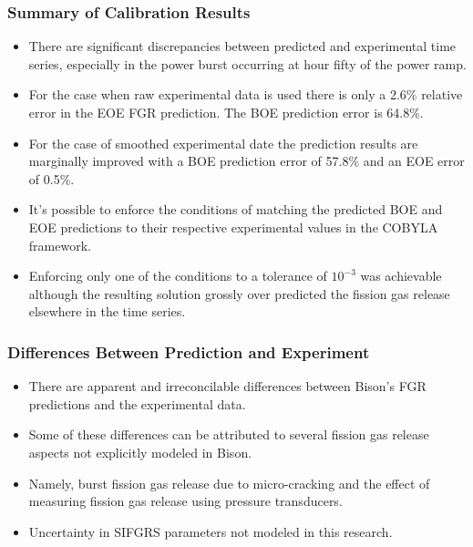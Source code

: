
\begin{frame}
\frametitle{Summary of Calibration Results}

\begin{itemize}
  \item There are significant discrepancies between predicted and experimental time series, especially in the power burst occurring at hour fifty of the power ramp.
  \item For the case when raw experimental data is used there is only a 2.6\% relative error in the EOE FGR prediction. The BOE prediction error is 64.8\%. 
  \item For the case of smoothed experimental date the prediction results are marginally improved with a BOE prediction error of 57.8\% and an EOE error of 0.5\%. 
  \item It's possible to enforce the conditions of matching the predicted BOE and EOE predictions to their respective experimental values in the COBYLA framework. 
  \item Enforcing only one of the conditions to a tolerance of $10^{-3}$ was achievable although the resulting solution grossly over predicted the fission gas release elsewhere in the time series.
\end{itemize}

\end{frame}
\begin{frame}
\frametitle{Differences Between Prediction and Experiment}

\begin{itemize}
  \item There are apparent and irreconcilable differences between Bison's FGR predictions and the experimental data. 
  \item Some of these differences can be attributed to several fission gas release aspects not explicitly modeled in Bison. 
  \item Namely, burst fission gas release due to micro-cracking and the effect of measuring fission gas release using pressure transducers. 
  \item Uncertainty in SIFGRS parameters not modeled in this research.
\end{itemize}

\end{frame}
